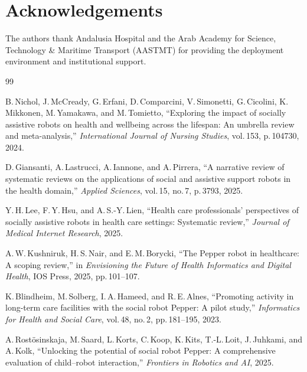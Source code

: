 \documentclass[conference]{IEEEtran}
\begin{document}
\section*{Acknowledgements}

The authors thank Andalusia Hospital and the Arab Academy for Science,
Technology \& Maritime Transport (AASTMT) for providing the deployment
environment and institutional support.


\begin{thebibliography}{99}

B.\,Nichol, J.\,McCready, G.\,Erfani, D.\,Comparcini, V.\,Simonetti, G.\,Cicolini,
K.\,Mikkonen, M.\,Yamakawa, and M.\,Tomietto,
``Exploring the impact of socially assistive robots on health and wellbeing across
the lifespan: An umbrella review and meta-analysis,''
\emph{International Journal of Nursing Studies}, vol.\,153, p.\,104730, 2024.

D.\,Giansanti, A.\,Lastrucci, A.\,Iannone, and A.\,Pirrera,
``A narrative review of systematic reviews on the applications of social and
assistive support robots in the health domain,''
\emph{Applied Sciences}, vol.\,15, no.\,7, p.\,3793, 2025.

Y.\,H.\,Lee, F.\,Y.\,Hsu, and A.\,S.-Y.\,Lien,
``Health care professionals' perspectives of socially assistive robots in health
care settings: Systematic review,''
\emph{Journal of Medical Internet Research}, 2025.

A.\,W.\,Kushniruk, H.\,S.\,Nair, and E.\,M.\,Borycki,
``The Pepper robot in healthcare: A scoping review,''
in \emph{Envisioning the Future of Health Informatics and Digital Health},
IOS Press, 2025, pp.\,101--107.

K.\,Blindheim, M.\,Solberg, I.\,A.\,Hameed, and R.\,E.\,Alnes,
``Promoting activity in long-term care facilities with the social robot Pepper:
A pilot study,''
\emph{Informatics for Health and Social Care}, vol.\,48, no.\,2,
pp.\,181--195, 2023.

A.\,Rost\"{o}sinskaja, M.\,Saard, L.\,Korts, C.\,Koop, K.\,Kits, T.-L.\,Loit,
J.\,Juhkami, and A.\,Kolk,
``Unlocking the potential of social robot Pepper: A comprehensive evaluation of
child--robot interaction,''
\emph{Frontiers in Robotics and AI}, 2025.


\end{thebibliography}
\end{document}
